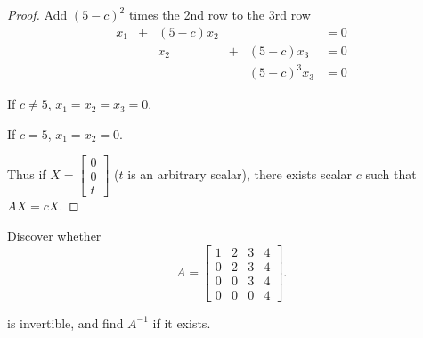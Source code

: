 \begin{proof}
    Add ${(5-c)}^{2}$ times the 2nd row to the 3rd row
    \[
        \begin{array}{cccccc}
            x_{1} & + & (5-c)x_{2} &   &                  & = 0 \\
                  &   & x_{2}      & + & (5-c)x_{3}       & = 0 \\
                  &   &            &   & {(5-c)}^{3}x_{3} & = 0
        \end{array}
    \]

    If $c\ne 5$, $x_{1} = x_{2} = x_{3} = 0$.

    If $c = 5$, $x_{1} = x_{2} = 0$.

    Thus if $X = \begin{bmatrix}0 \\ 0 \\ t\end{bmatrix}$ ($t$ is an arbitrary scalar), there exists scalar $c$ such that $AX = cX$.
\end{proof}

\begin{exercise}
    Discover whether
    \[
        A = \begin{bmatrix}
            1 & 2 & 3 & 4 \\
            0 & 2 & 3 & 4 \\
            0 & 0 & 3 & 4 \\
            0 & 0 & 0 & 4
        \end{bmatrix}.
    \]

    is invertible, and find $A^{-1}$ if it exists.
\end{exercise}

